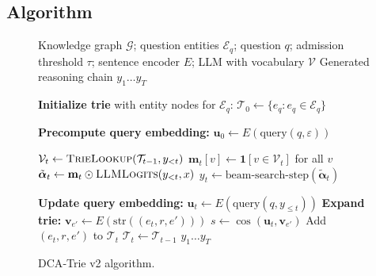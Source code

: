 \subsection{Algorithm}

\begin{figure}[H]
  \centering
  \begin{algorithm}[H]
    \caption{DCA‑Trie v2: Step‑Wise Semantic Expansion}
    \label{alg:v2}
    \begin{algorithmic}[1]
      \Require Knowledge graph $\mathcal{G}$; question entities $\mathcal{E}_q$;
      question $q$; admission threshold $\tau$; sentence encoder $E$;
      LLM with vocabulary $\mathcal{V}$
      \Ensure Generated reasoning chain $y_1 \ldots y_T$

      \State \textbf{Initialize trie} with entity nodes for $\mathcal{E}_q$:
      $\mathcal{T}_0 \gets \{e_q : e_q \in \mathcal{E}_q\}$

      \State \textbf{Precompute query embedding:}
      $\mathbf{u}_0 \gets E(\text{query}(q, \varepsilon))$

      \State $\mathcal{V}_t \gets \textsc{TrieLookup}(\mathcal{T}_{t-1}, y_{<t})$
      \State $\mathbf{m}_t[v] \gets \mathbf{1}[v \in \mathcal{V}_t]$ for all $v$
      \State $\tilde{\boldsymbol{\alpha}}_t \gets \mathbf{m}_t \odot
        \textsc{LLMLogits}(y_{<t}, x)$
      \State $y_t \gets \text{beam-search-step}(\tilde{\boldsymbol{\alpha}}_t)$

      \State \textbf{Update query embedding:}
      $\mathbf{u}_t \gets E(\text{query}(q, y_{\leq t}))$
      \State \textbf{Expand trie:}
      \State $\mathbf{v}_{e'} \gets E(\text{str}((e_t, r, e')))$
      \State $s \gets \cos(\mathbf{u}_t, \mathbf{v}_{e'})$
      \State Add $(e_t, r, e')$ to $\mathcal{T}_t$
      \EndIf
      \EndFor
      \Else
      \State $\mathcal{T}_t \gets \mathcal{T}_{t-1}$
      \EndIf
      \EndFor
      \State \Return $y_1 \ldots y_T$
    \end{algorithmic}
  \end{algorithm}
  \caption[Algorithm for DCA‑Trie v2]{DCA‑Trie v2 algorithm.}
  \label{fig:alg:v2}
\end{figure}

